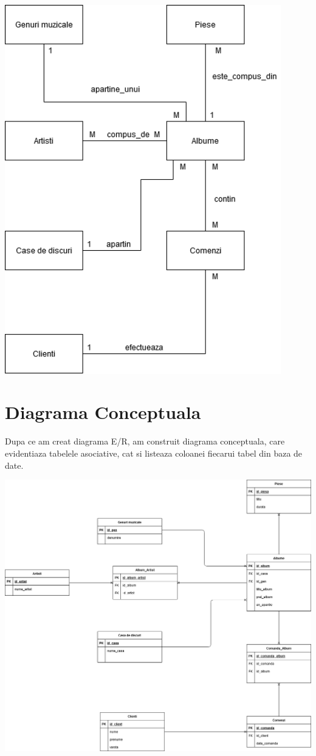 \documentclass{article}
\begin{document}
\includegraphics[width=0.9\textwidth]{2-erd-22.png}

\newpage
\section{Diagrama Conceptuala}
Dupa ce am creat diagrama E/R, am construit diagrama conceptuala, care evidentiaza tabelele asociative, cat si listeaza coloanei fiecarui tabel din baza de date.


\includegraphics[width=\textwidth]{3-diag.png}
\end{document}
